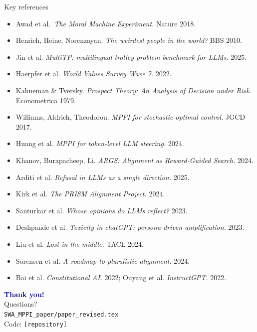 \documentclass[10pt,aspectratio=169]{beamer}
\begin{document}
\begin{frame}{Key references}
  \scriptsize
  \begin{itemize}
    \item Awad et al.\ \emph{The Moral Machine Experiment.} Nature 2018.
    \item Henrich, Heine, Norenzayan. \emph{The weirdest people in the world?} BBS 2010.
    \item Jin et al. \emph{MultiTP: multilingual trolley problem benchmark for LLMs.} 2025.
    \item Haerpfer et al. \emph{World Values Survey Wave 7.} 2022.
    \item Kahneman \& Tversky. \emph{Prospect Theory: An Analysis of Decision under Risk.} Econometrica 1979.
    \item Williams, Aldrich, Theodorou. \emph{MPPI for stochastic optimal control.} JGCD 2017.
    \item Huang et al. \emph{MPPI for token-level LLM steering.} 2024.
    \item Khanov, Burapacheep, Li. \emph{ARGS: Alignment as Reward-Guided Search.} 2024.
    \item Arditi et al. \emph{Refusal in LLMs as a single direction.} 2025.
    \item Kirk et al. \emph{The PRISM Alignment Project.} 2024.
    \item Santurkar et al. \emph{Whose opinions do LLMs reflect?} 2023.
    \item Deshpande et al. \emph{Toxicity in chatGPT: persona-driven amplification.} 2023.
    \item Liu et al. \emph{Lost in the middle.} TACL 2024.
    \item Sorensen et al. \emph{A roadmap to pluralistic alignment.} 2024.
    \item Bai et al. \emph{Constitutional AI.} 2022; Ouyang et al. \emph{InstructGPT.} 2022.
  \end{itemize}
\end{frame}

\begin{frame}
  \centering
  \vspace{1.5em}
  {\Huge \textcolor{darkblue}{\textbf{Thank you!}}}\\[1em]
  {\Large Questions?}\\[2em]
  \normalsize
  \texttt{SWA\_MPPI\_paper/paper\_revised.tex}\\[0.5em]
  \footnotesize Code: \texttt{[repository]}
\end{frame}
\end{document}
